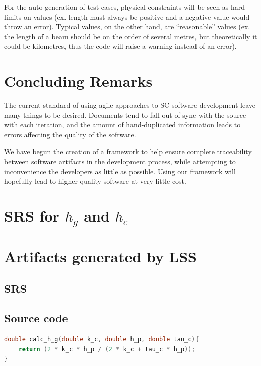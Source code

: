 \documentclass{sig-alternate-05-2015}
\newcommand{\lss}{LSS}
\begin{document}
For the auto-generation of test cases, physical constraints will be seen as hard
limits on values (ex. length must always be positive and a negative value would throw an error). Typical values, on the other hand, are ``reasonable'' values (ex.
the length of a beam should be on the order of several metres, but theoretically it could be kilometres, thus the code will raise a warning instead of an error).

    
\section{Concluding Remarks} \label{sec:conclusion}

The current standard of using agile approaches to SC software development leave
many things to be desired. Documents tend to fall out of sync with the source
with each iteration, and the amount of hand-duplicated information leads to
errors affecting the quality of the software.

We have begun the creation of a framework to help ensure complete traceability
between software artifacts in the development process, while attempting to
inconvenience the developers as little as possible. Using our framework will
hopefully lead to higher quality software at very little cost.



  
\appendix
\section{SRS for $h_g$ and $h_c$} \label{app:srs}


\section{Artifacts generated by \lss} \label{app:gen}
\subsection{SRS}
\subsection{Source code}
\begin{lstlisting}[language=C, frame=single, showstringspaces=false, basicstyle=\tiny]
double calc_h_g(double k_c, double h_p, double tau_c){
    return (2 * k_c * h_p / (2 * k_c + tau_c * h_p));
}
\end{lstlisting}
\end{document}
